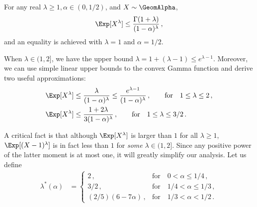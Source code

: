 \begin{proposition}\label{prop:geom-moment-bound}
For any real $\lambda \geq 1, \alpha \in (0, 1/2)$, and $X \sim \GeomAlpha$,
\begin{equation}\label{eq:geom-moment-bound}
    \Exp[X^\lambda] \leq \frac{\Gamma(1+\lambda)}{(1-\alpha)^\lambda} 
    \, ,
\end{equation}
and an equality is achieved with $\lambda = 1$ and $\alpha = 1/2$.
\end{proposition}
When $\lambda \in (1,2]$, we have the upper bound $\lambda = 1 + (\lambda - 1) \leq e^{\lambda - 1}$. 
Moreover, we can use simple linear upper bounds to the convex Gamma function and 
derive two useful approximations:
\begin{align}
    \Exp[X^\lambda] 
    &\leq \frac{\lambda}{(1-\alpha)^\lambda} \leq \frac{e^{\lambda-1}}{(1-\alpha)^\lambda}
        \,,\qquad\text{for}\quad 1 \leq \lambda \leq 2
        \label{eq:geom-moment-bound-approx-1}
        \,, \\
    \Exp[X^\lambda] 
    &\leq
        \frac{1+2\lambda}{3(1-\alpha)^\lambda}\,, \qquad\text{for}\quad 1 \leq \lambda \leq 3/2
        \label{eq:geom-moment-bound-approx-2}
        \,.
\end{align}

A critical fact is that although $\Exp[X^\lambda]$ is larger than $1$ for all $\lambda \geq 1$, 
$\Exp[(X-1)^\lambda]$ is in fact less than $1$ for \emph{some} $\lambda \in (1, 2]$. 
Since any positive power of the latter moment is at most one, it will greatly simplify our analysis. 
Let us define
\begin{align}\label{eq:lambda-star}
 \lambda^*(\alpha) &= \begin{cases}
    2\,, & \text{for}\quad 0 < \alpha \leq 1/4 \, ,\\
    3/2\,, & \text{for}\quad 1/4 < \alpha \leq 1/3 \, ,\\
    (2/5)(6 - 7 \alpha)\,, & \text{for}\quad 1/3 < \alpha < 1/2 \, .
\end{cases}
\end{align}

